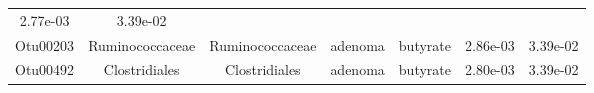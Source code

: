 \documentclass[11pt,]{article}
\begin{document}
\begin{longtable}[]{@{}ccccccc@{}}
\begin{minipage}[t]{0.09\columnwidth}
2.77e-03\strut
\end{minipage} & \begin{minipage}[t]{0.09\columnwidth}\centering\strut
3.39e-02\strut
\end{minipage}\tabularnewline
\begin{minipage}[t]{0.09\columnwidth}\centering\strut
Otu00203\strut
\end{minipage} & \begin{minipage}[t]{0.17\columnwidth}\centering\strut
Ruminococcaceae\strut
\end{minipage} & \begin{minipage}[t]{0.17\columnwidth}\centering\strut
Ruminococcaceae\strut
\end{minipage} & \begin{minipage}[t]{0.09\columnwidth}\centering\strut
adenoma\strut
\end{minipage} & \begin{minipage}[t]{0.11\columnwidth}\centering\strut
butyrate\strut
\end{minipage} & \begin{minipage}[t]{0.09\columnwidth}\centering\strut
2.86e-03\strut
\end{minipage} & \begin{minipage}[t]{0.09\columnwidth}\centering\strut
3.39e-02\strut
\end{minipage}\tabularnewline
\begin{minipage}[t]{0.09\columnwidth}\centering\strut
Otu00492\strut
\end{minipage} & \begin{minipage}[t]{0.17\columnwidth}\centering\strut
Clostridiales\strut
\end{minipage} & \begin{minipage}[t]{0.17\columnwidth}\centering\strut
Clostridiales\strut
\end{minipage} & \begin{minipage}[t]{0.09\columnwidth}\centering\strut
adenoma\strut
\end{minipage} & \begin{minipage}[t]{0.11\columnwidth}\centering\strut
butyrate\strut
\end{minipage} & \begin{minipage}[t]{0.09\columnwidth}\centering\strut
2.80e-03\strut
\end{minipage} & \begin{minipage}[t]{0.09\columnwidth}\centering\strut
3.39e-02\strut
\end{minipage}\tabularnewline

\end{longtable}
\end{document}
